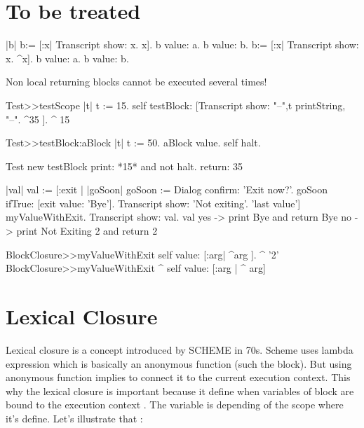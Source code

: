 \documentclass[a4paper,10pt,twoside]{book}
\begin{document}
\section{To be treated}

\begin{code}{}
|b| 
b:= [:x| Transcript show: x. x].
b value: a. b value: b.
b:= [:x| Transcript show: x. ^x].
b value: a. b value: b.
\end{code}
 
Non local returning blocks cannot be executed several times!

\begin{code}{}
Test>>testScope
	   |t|
    	t := 15.
	   self testBlock: [Transcript show: "--",t printString, "--".
	   ^35 ].
    ^ 15

Test>>testBlock:aBlock
	   |t|
	   t := 50.
	   aBlock value.
	   self halt.
\end{code}

\begin{code}{}
Test new testBlock 	
print: *15* and not halt. 
return: 35
\end{code}


\begin{code}{}
|val|
val := [:exit |
		|goSoon|
		goSoon := Dialog confirm: 'Exit now?'.
		goSoon ifTrue: [exit value: 'Bye'].
		Transcript show: 'Not exiting'.
		'last value'] myValueWithExit.
Transcript show: val.
val
yes -> print Bye and return  Bye
no -> print Not Exiting 2 and return 2
\end{code}

\begin{code}{}
BlockClosure>>myValueWithExit
	      self value: [:arg| ^arg ].
      ^ '2'
BlockClosure>>myValueWithExit
 ^ self value: [:arg | ^ arg]        
\end{code}


\section{Lexical Closure}

Lexical closure is a concept introduced by SCHEME in 70s. Scheme uses lambda expression which is basically an anonymous function (such the block). But using anonymous function implies to connect it to the current execution context. This  why the lexical closure is important because it define when variables of block are bound to the execution context . The variable is depending of the scope where it's  define. Let's illustrate that :
\end{document}
